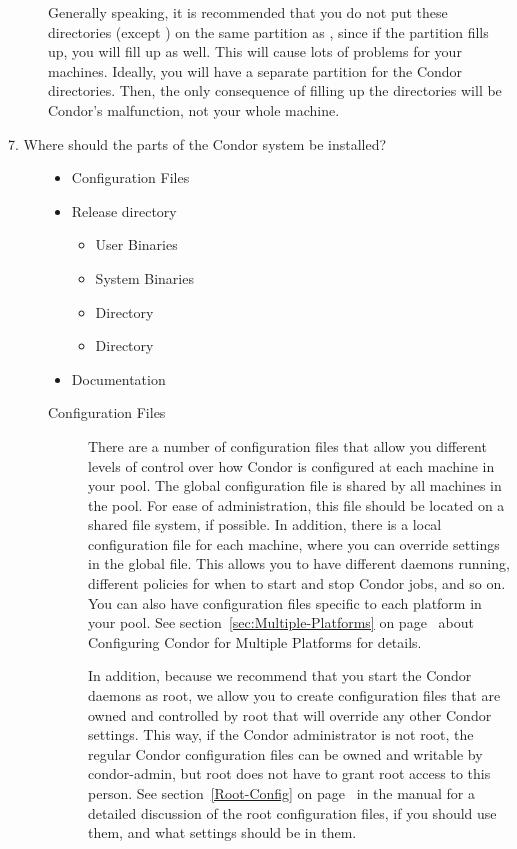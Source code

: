 \begin{description}
\begin{description}
\end{description}

Generally speaking, it is recommended that you do not put these directories
(except ) on the same partition as ,
since if the partition
fills up, you will fill up  as well. 
This will cause lots of
problems for your machines.  Ideally, you will have a separate partition
for the Condor directories. Then, the only consequence of filling up
the directories
will be Condor's malfunction, not your whole machine.

\item[7. Where should the parts of the Condor system be installed?]

	\begin{itemize}
	\item Configuration Files
	\item Release directory
		\begin{itemize}
		\item User Binaries
		\item System Binaries 
		\item {} Directory
	  	\item {} Directory
		\end{itemize}
	\item Documentation
	\end{itemize}

\label{sec:Config-File-Locations}
\begin{description}
\item[Configuration Files] There are a number of configuration files
that allow you
different levels of control over how Condor is configured at each
machine in your pool.  
The global configuration file is shared by all machines in the pool.
For ease of administration, this file should be located on a shared
file system, if possible.
In addition, there is a local
configuration file for each machine, where you can override settings in the
global file.  This allows you to have different daemons running,
different policies for when to start and stop Condor jobs, and so on.
You can also have configuration files specific to each platform in your pool.
See
section~\ref{sec:Multiple-Platforms} on
page~\pageref{sec:Multiple-Platforms} about Configuring Condor for
Multiple Platforms for details.

In addition, because we recommend that you start the Condor daemons as
root, we allow you to create configuration files that are owned and
controlled by root that will override any other Condor settings.  This
way, if the Condor administrator is not root, the regular Condor configuration
files can be owned and writable by condor-admin, but root does not have
to grant root access to this person.  See
section~\ref{Root-Config} on page~\pageref{Root-Config} in the
manual for a detailed discussion of the root configuration files, if you
should use them, and what settings should be in them.


\end{description}
\end{description}
